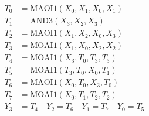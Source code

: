 \documentclass[final,5p,times,twocolumn]{elsarticle}
\begin{document}
\begin{align}
    T_0 & = \text{MAOI1}(X_0, X_1, X_0, X_1) \nonumber            \\
    T_1 & = \text{AND3}(X_3, X_2, X_3) \nonumber                  \\
    T_2 & = \text{MAOI1}(X_1, X_2, X_0, X_3) \nonumber            \\
    T_3 & = \text{MOAI1}(X_1, X_0, X_2, X_2) \nonumber            \\
    T_4 & = \text{MOAI1}(X_3, T_0, T_3, T_3) \label{eq2}          \\
    T_5 & = \text{MOAI1}(T_3, T_0, X_0, T_1) \nonumber            \\
    T_6 & = \text{MAOI1}(X_0, T_0, X_3, T_0) \nonumber            \\
    T_7 & = \text{MOAI1}(X_0, T_1, T_2, T_2) \nonumber            \\
    Y_3 & = T_4 \quad Y_2 = T_6 \quad Y_1 = T_7 \quad  Y_0  = T_5
    \nonumber
\end{align}
\end{document}
